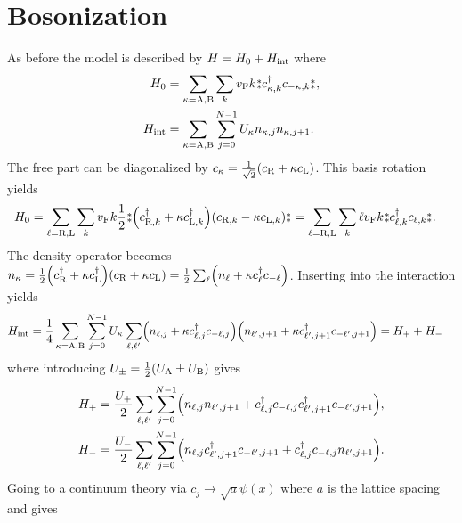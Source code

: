 \documentclass[english, parskip=full]{scrartcl}
\title{\titel}
\author{\autor}
\date{\today}
\begin{document}
\maketitle  %

\section{Bosonization}
As before the model is described by $H=H_0+H_{\text{int}}$ where
\begin{align}
H_0 &= \sum_{\kappa=\A,\B} \sum_k \vf k \varnormord{c_{\kappa,k}^\dagger c_{-\kappa,k}},\\
H_\Text{int} &= \sum_{\kappa=\A,\B} \sum_{j=0}^{N-1} U_\kappa n_{\kappa,j} n_{\kappa,j+1}.
\end{align}
The free part can be diagonalized by $c_{\kappa} = \frac{1}{\sqrt{2}} \kla*{c_{\R} + \kappa c_{\L}}$.
This basis rotation yields
\begin{align}
H_0 &= \sum_{\ell=\R,\L} \sum_k \vf k \frac{1}{2} \varnormord{\kla*{c_{\R,k}^\dagger + \kappa c_{\L,k}^\dagger} \kla*{c_{\R,k} - \kappa c_{\L,k}}} = \sum_{\ell=\R,\L} \sum_k \ell\vf k\varnormord{c_{\ell,k}^\dagger c_{\ell,k}}.
\end{align}
The density operator becomes $n_{\kappa} = \frac{1}{2} \kla*{c_{\R}^\dagger + \kappa c_{\L}^\dagger} \kla*{c_{\R} + \kappa c_{\L}} = \frac{1}{2} \sum_\ell \kla*{n_{\ell} + \kappa c_{\ell}^\dagger c_{-\ell}}$.
Inserting into the interaction yields
\begin{align}
H_\Text{int} &= \frac{1}{4} \sum_{\kappa=\A,\B} \sum_{j=0}^{N-1} U_\kappa \sum_{\ell,\ell'} \kla*{n_{\ell,j} + \kappa c_{\ell,j}^\dagger c_{-\ell,j}} \kla*{n_{\ell',j+1} + \kappa c_{\ell',j+1}^\dagger c_{-\ell',j+1}} = H_+ + H_-
\end{align}
where introducing $U_\pm = \frac{1}{2} \kla*{U_\A \pm U_\B}$ gives
\begin{align}
H_+ &= \frac{U_+}{2} \sum_{\ell,\ell'} \sum_{j=0}^{N-1} \kla*{n_{\ell,j} n_{\ell',j+1} + c_{\ell,j}^\dagger c_{-\ell,j} c_{\ell',j+1}^\dagger c_{-\ell',j+1}},\\
H_- &= \frac{U_-}{2} \sum_{\ell,\ell'} \sum_{j=0}^{N-1} \kla*{n_{\ell,j} c_{\ell',j+1}^\dagger c_{-\ell',j+1} + c_{\ell,j}^\dagger c_{-\ell,j} n_{\ell',j+1}}.
\end{align}
Going to a continuum theory via $c_j\rightarrow \sqrt{a}\psi(x)$ where $a$ is the lattice spacing and gives
\end{document}
